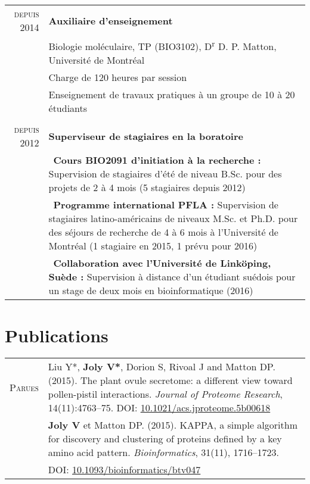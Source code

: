 \documentclass[letterpaper,10pt]{article}
\begin{document}
{\begin{tabular}{r|p{12.5cm}}
\textsc{depuis 2014} & \textbf{Auxiliaire d'enseignement} \\
& Biologie moléculaire, TP (BIO3102), D\textsuperscript{r} D. P. Matton, Université de Montréal \\
& {\textbullet{} Charge de 120 heures par session} \\
& {\textbullet{} Enseignement de travaux pratiques à un groupe de 10 à 20 étudiants} \vspace{1.5mm} \\
\multicolumn{2}{c}{} \\

\textsc{depuis 2012} & \textbf{Superviseur de stagiaires en la boratoire} \vspace{1mm} \\
& \textbullet{}~\textbf{Cours BIO2091 d'initiation à la recherche :} Supervision de stagiaires d'été de niveau B.Sc. pour des projets de 2 à 4 mois (5 stagiaires depuis 2012)\vspace{1mm} \\
& \textbullet{}~\textbf{Programme international PFLA :} Supervision de stagiaires latino-américains de niveaux M.Sc. et Ph.D. pour des séjours de recherche de 4 à 6 mois  à l'Université de Montréal (1 stagiaire en 2015, 1 prévu pour 2016) \vspace{1mm} \\
& \textbullet{}~\textbf{Collaboration avec l'Université de Linköping, Suède :} Supervision à distance d'un étudiant suédois pour un stage de deux mois en bioinformatique (2016) \\
\end{tabular}

\vspace{8mm}

\section{Publications}
\begin{tabular}{r|p{12.5cm}}

\textsc{Parues}

& Liu Y*, \textbf{Joly V*}, Dorion S, Rivoal J and Matton DP. (2015). The plant ovule secretome: a different view toward pollen-pistil interactions. \emph{Journal of Proteome Research}, 14(11):4763--75. DOI: \href{http://doi.org/10.1021/acs.jproteome.5b00618}{10.1021/acs.jproteome.5b00618} \vspace{3mm} \\

& \textbf{Joly V} et Matton DP. (2015). KAPPA, a simple algorithm for discovery and clustering of proteins defined by a key amino acid pattern. \emph{Bioinformatics}, 31(11), 1716--1723.\\
& DOI: \href{http://doi.org/10.1093/bioinformatics/btv047}{10.1093/bioinformatics/btv047} \vspace{3mm} \\


\end{tabular}}
\end{document}
